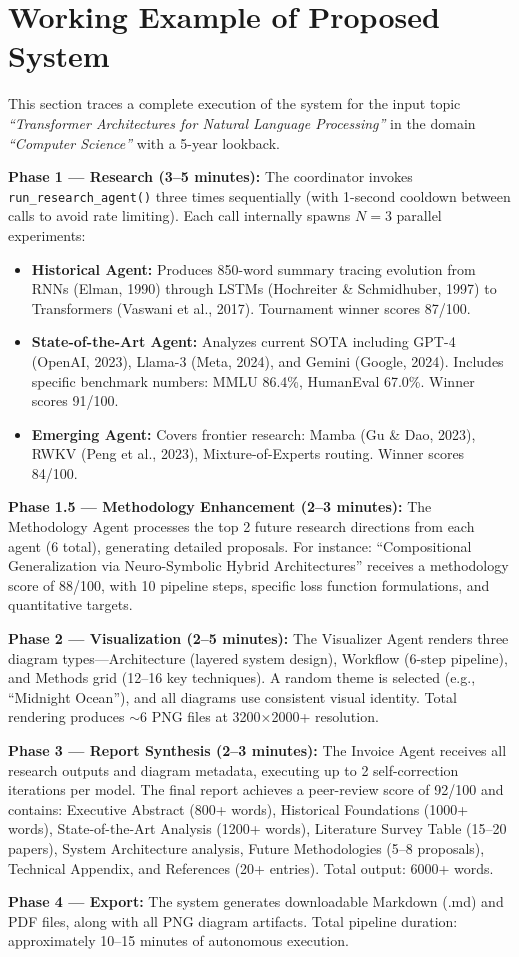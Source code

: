 \section{Working Example of Proposed System}

This section traces a complete execution of the system for the input topic \textit{``Transformer Architectures for Natural Language Processing''} in the domain \textit{``Computer Science''} with a 5-year lookback.

\textbf{Phase 1 --- Research (3--5 minutes):} The coordinator invokes \texttt{run\_research\_agent()} three times sequentially (with 1-second cooldown between calls to avoid rate limiting). Each call internally spawns $N=3$ parallel experiments:

\begin{itemize}[leftmargin=2cm]
\item \textbf{Historical Agent:} Produces 850-word summary tracing evolution from RNNs (Elman, 1990) through LSTMs (Hochreiter \& Schmidhuber, 1997) to Transformers (Vaswani et al., 2017). Tournament winner scores 87/100.
\item \textbf{State-of-the-Art Agent:} Analyzes current SOTA including GPT-4 (OpenAI, 2023), Llama-3 (Meta, 2024), and Gemini (Google, 2024). Includes specific benchmark numbers: MMLU 86.4\%, HumanEval 67.0\%. Winner scores 91/100.
\item \textbf{Emerging Agent:} Covers frontier research: Mamba (Gu \& Dao, 2023), RWKV (Peng et al., 2023), Mixture-of-Experts routing. Winner scores 84/100.
\end{itemize}

\textbf{Phase 1.5 --- Methodology Enhancement (2--3 minutes):} The Methodology Agent processes the top 2 future research directions from each agent (6 total), generating detailed proposals. For instance: ``Compositional Generalization via Neuro-Symbolic Hybrid Architectures'' receives a methodology score of 88/100, with 10 pipeline steps, specific loss function formulations, and quantitative targets.

\textbf{Phase 2 --- Visualization (2--5 minutes):} The Visualizer Agent renders three diagram types---Architecture (layered system design), Workflow (6-step pipeline), and Methods grid (12--16 key techniques). A random theme is selected (e.g., ``Midnight Ocean''), and all diagrams use consistent visual identity. Total rendering produces $\sim$6 PNG files at 3200$\times$2000+ resolution.

\textbf{Phase 3 --- Report Synthesis (2--3 minutes):} The Invoice Agent receives all research outputs and diagram metadata, executing up to 2 self-correction iterations per model. The final report achieves a peer-review score of 92/100 and contains: Executive Abstract (800+ words), Historical Foundations (1000+ words), State-of-the-Art Analysis (1200+ words), Literature Survey Table (15--20 papers), System Architecture analysis, Future Methodologies (5--8 proposals), Technical Appendix, and References (20+ entries). Total output: 6000+ words.

\textbf{Phase 4 --- Export:} The system generates downloadable Markdown (.md) and PDF files, along with all PNG diagram artifacts. Total pipeline duration: approximately 10--15 minutes of autonomous execution.

